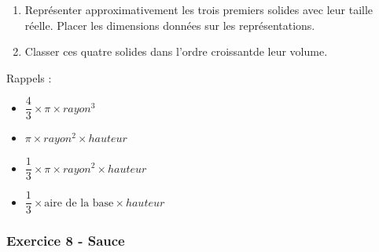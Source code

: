 \documentclass[11pt]{article}
\begin{document}
\begin{enumerate}
\item Représenter approximativement les trois premiers solides avec leur taille réelle. Placer les dimensions données sur les représentations.
\item Classer ces quatre solides dans l’ordre croissantde leur volume.\\
\end{enumerate}

Rappels : 

\begin{itemize}
  \item $\dfrac{4}{3} \times \pi  \times rayon^3$
  \item $\pi  \times rayon^2  \times hauteur $
  \item $\dfrac{1}{3} \times \pi \times rayon^2 \times hauteur$
  \item $\dfrac{1}{3} \times \text{aire de la base} \times hauteur$
\end{itemize}

\subsubsection*{Exercice 8 - Sauce}
\end{document}
